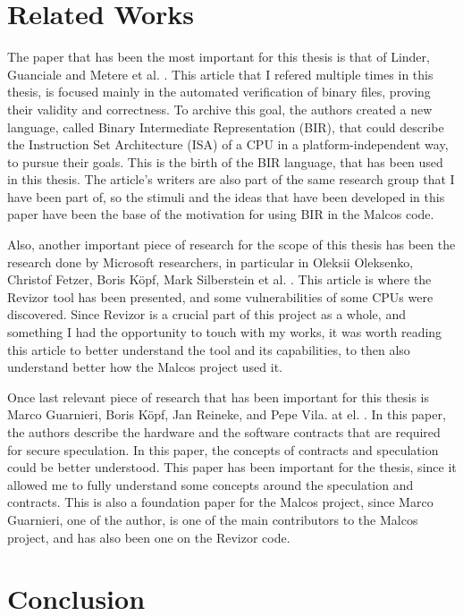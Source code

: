 \chapter{Related Works}
\label{cha:related_works}The paper that has been the most important for this
thesis is that of Linder, Guanciale and Metere et al. \cite{bir_pub}. This article
that I refered multiple times in this thesis, is focused mainly in the automated
verification of binary files, proving their validity and correctness. To archive
this goal, the authors created a new language, called Binary Intermediate
Representation (BIR), that could describe the Instruction Set Architecture (ISA)
of a CPU in a platform-independent way, to pursue their goals. This is the birth
of the BIR language, that has been used in this thesis. The article's writers are
also part of the same research group that I have been part of, so the stimuli
and the ideas that have been developed in this paper have been the base of the
motivation for using BIR in the Malcos code.

Also, another important piece of research for the scope of this thesis has been the
research done by Microsoft researchers, in particular in Oleksii Oleksenko, Christof
Fetzer, Boris Köpf, Mark Silberstein et al. \cite{article}. This article is where
the Revizor tool has been presented, and some vulnerabilities of some CPUs were
discovered. Since Revizor is a crucial part of this project as a whole, and
something I had the opportunity to touch with my works, it was worth reading this
article to better understand the tool and its capabilities, to then also
understand better how the Malcos project used it.

Once last relevant piece of research that has been important for this thesis is
Marco Guarnieri, Boris Köpf, Jan Reineke, and Pepe Vila. at el. \cite{contracts_paper}.
In this paper, the authors describe the hardware and the software contracts that
are required for secure speculation. In this paper, the concepts of contracts and
speculation could be better understood. This paper has been important for the
thesis, since it allowed me to fully understand some concepts around the speculation
and contracts. This is also a foundation paper for the Malcos project, since Marco
Guarnieri, one of the author, is one of the main contributors to the Malcos project,
and has also been one on the Revizor code.

\chapter{Conclusion}
\label{cha:conclusion}

